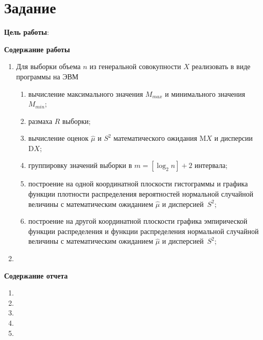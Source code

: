 \chapter{Задание}

\textbf{Цель работы}:

\textbf{Содержание работы}

\begin{enumerate}
    \item Для выборки объема $n$ из генеральной совокупности $X$ реализовать в
        виде программы на ЭВМ
        \begin{enumerate}[label=\asbuk*)]
            \item вычисление максимального значения $M_{max}$ и минимального
                значения $M_{min}$;
            \item размаха $R$ выборки;
            \item вычисление оценок $\hat{\mu}$ и $S^2$ математического ожидания
                $\mathrm{M}X$ и дисперсии $\mathrm{D}X$;
            \item группировку значений выборки в $m = [\log_2 n] + 2$ интервала;
            \item построение на одной координатной плоскости гистограммы и
                графика функции плотности распределения вероятностей нормальной
                случайной величины с математическим ожиданием $\hat{\mu}$ и
                дисперсией~$S^2$;
            \item построение на другой координатной плоскости графика
                эмпирической функции распределения и функции распределения
                нормальной случайной величины с математическим ожиданием
                $\hat{\mu}$ и дисперсией~$S^2$;
        \end{enumerate}
    \item
\end{enumerate}

\textbf{Содержание отчета}

\begin{enumerate}
    \item 
    \item 
    \item 
    \item 
    \item 
\end{enumerate}
